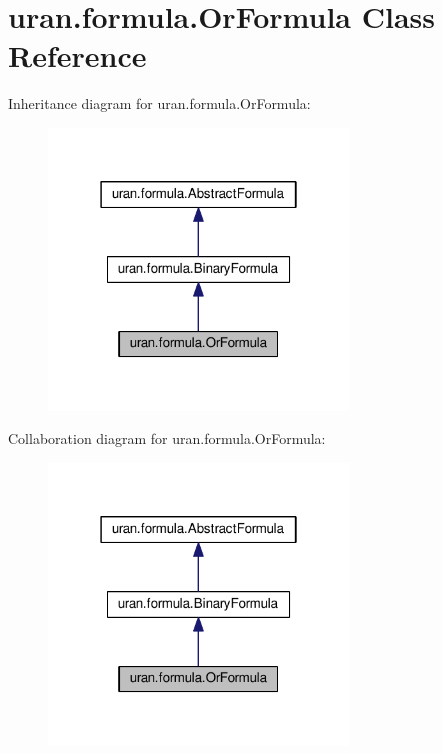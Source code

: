 \hypertarget{classuran_1_1formula_1_1_or_formula}{}\section{uran.\+formula.\+Or\+Formula Class Reference}
\label{classuran_1_1formula_1_1_or_formula}


Inheritance diagram for uran.\+formula.\+Or\+Formula\+:
\nopagebreak
\begin{figure}[H]
\begin{center}
\leavevmode
\includegraphics[width=226pt]{classuran_1_1formula_1_1_or_formula__inherit__graph}
\end{center}
\end{figure}


Collaboration diagram for uran.\+formula.\+Or\+Formula\+:
\nopagebreak
\begin{figure}[H]
\begin{center}
\leavevmode
\includegraphics[width=226pt]{classuran_1_1formula_1_1_or_formula__coll__graph}
\end{center}
\end{figure}
